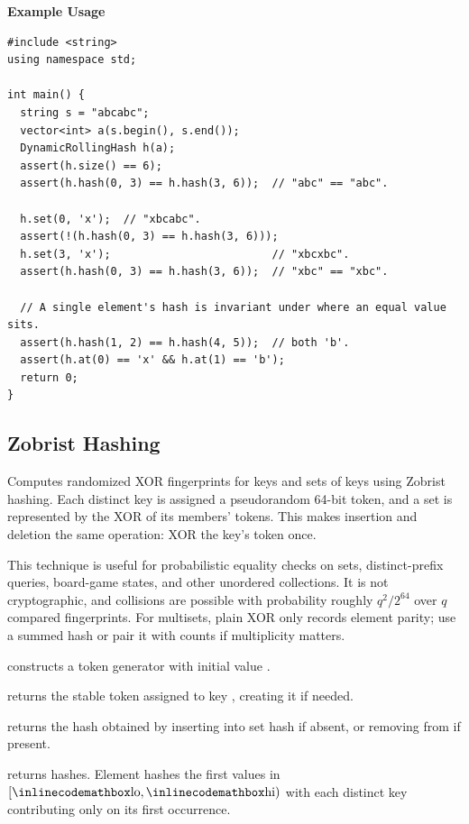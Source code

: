 \textbf{Example Usage}\par
\begin{lstlisting}[style=cpp]
#include <string>
using namespace std;

int main() {
  string s = "abcabc";
  vector<int> a(s.begin(), s.end());
  DynamicRollingHash h(a);
  assert(h.size() == 6);
  assert(h.hash(0, 3) == h.hash(3, 6));  // "abc" == "abc".

  h.set(0, 'x');  // "xbcabc".
  assert(!(h.hash(0, 3) == h.hash(3, 6)));
  h.set(3, 'x');                         // "xbcxbc".
  assert(h.hash(0, 3) == h.hash(3, 6));  // "xbc" == "xbc".

  // A single element's hash is invariant under where an equal value sits.
  assert(h.hash(1, 2) == h.hash(4, 5));  // both 'b'.
  assert(h.at(0) == 'x' && h.at(1) == 'b');
  return 0;
}
\end{lstlisting}
\subsection{Zobrist Hashing}
\label{sec:3.2.5}
Computes randomized XOR fingerprints for keys and sets of keys using Zobrist hashing. Each distinct key is assigned a pseudorandom 64-bit token, and a set is represented by the XOR of its members' tokens. This makes insertion and deletion the same operation: XOR the key's token once.

This technique is useful for probabilistic equality checks on sets, distinct-prefix queries, board-game states, and other unordered collections. It is not cryptographic, and collisions are possible with probability roughly $q^2 / 2^{64}$ over $q$ compared fingerprints. For multisets, plain XOR only records element parity; use a summed hash or pair it with counts if multiplicity matters.

\begin{compactitem}
  \item {} constructs a token generator with initial value .
  \item {} returns the stable token assigned to key , creating it if needed.
  \item {} returns the hash obtained by inserting  into set hash  if absent, or removing  from  if present.
  \item {} returns  hashes. Element  hashes the first  values in $[{\inlinecodemath{lo}}, {\inlinecodemath{hi}})$ with each distinct key contributing only on its first occurrence.
\end{compactitem}

